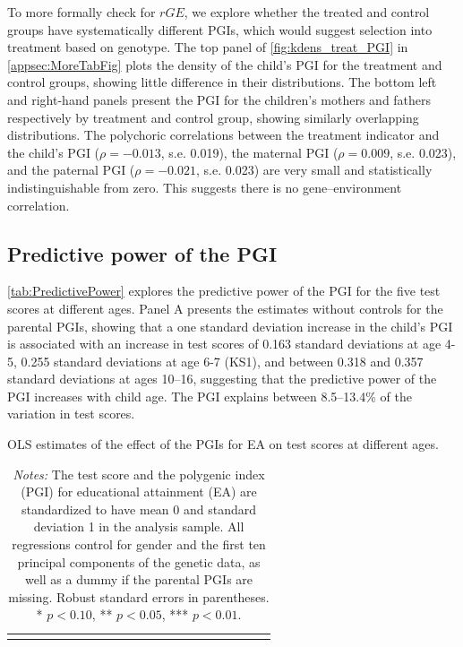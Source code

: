 \documentclass[12pt,a4paper]{article}
\begin{document}
\begin{bibunit}
To more formally check for $rGE$, we explore whether the treated and control groups have systematically different PGIs, which would suggest selection into treatment based on genotype. The top panel of \autoref{fig:kdens_treat_PGI} in \autoref{appsec:MoreTabFig} plots the density of the child's PGI for the treatment and control groups, showing little difference in their distributions. The bottom left and right-hand panels present the PGI for the children's mothers and fathers respectively by treatment and control group, showing similarly overlapping distributions. 
The polychoric correlations between the treatment indicator and the child's PGI ($\rho = -0.013$, s.e. 0.019), the maternal PGI ($\rho = 0.009$, s.e. 0.023), and the paternal PGI ($\rho = -0.021$, s.e. 0.023) are very small and statistically indistinguishable from zero. This suggests there is no gene--environment correlation. 

\subsection{Predictive power of the PGI} \label{sec:PGI}
\autoref{tab:PredictivePower} explores the predictive power of the PGI for the five test scores at different ages. Panel A presents the estimates without controls for the parental PGIs, showing that a one standard deviation increase in the child's PGI is associated with an increase in test scores of 0.163 standard deviations at age 4-5, 0.255 standard deviations at age 6-7 (KS1), and between 0.318 and 0.357 standard deviations at ages 10--16, suggesting that the predictive power of the PGI increases with child age. The PGI explains between 8.5--13.4\% of the variation in test scores.

\begin{table}[H]
\caption{OLS estimates of the effect of the PGIs for EA on test scores at different ages.}
\centering
{\footnotesize
\begin{tabular}{lcccccccccccccccccccc}
\toprule

\bottomrule
\addlinespace[.75ex]
\end{tabular}
\label{tab:PredictivePower}
}
\caption*{\footnotesize \noindent \textit{Notes:} The test score and the polygenic index (PGI) for educational attainment (EA) are standardized to have mean 0 and standard deviation 1 in the analysis sample. All regressions control for gender and the first ten principal components of the genetic data, as well as a dummy if the parental PGIs are missing. Robust standard errors in parentheses. * $p < 0.10$, ** $p < 0.05$, *** $p < 0.01$.}
\end{table}


\end{bibunit}
\end{document}

